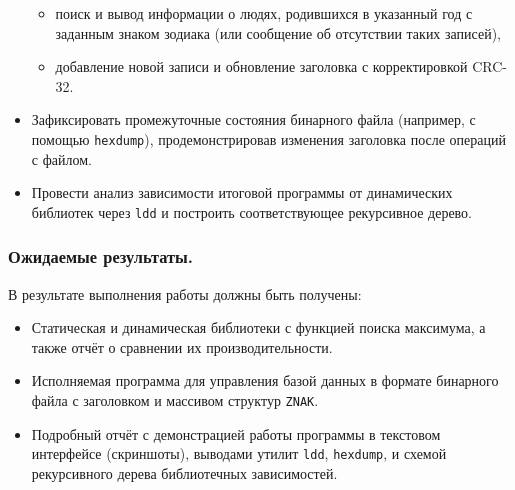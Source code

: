 \begin{itemize}
\begin{itemize}
\item поиск и вывод информации о людях, родившихся в указанный год с заданным знаком зодиака (или сообщение об отсутствии таких записей),
\item добавление новой записи и обновление заголовка с корректировкой CRC-32.
\end{itemize}
\item Зафиксировать промежуточные состояния бинарного файла (например, с помощью \texttt{hexdump}), продемонстрировав изменения заголовка после операций с файлом.
\item Провести анализ зависимости итоговой программы от динамических библиотек через \texttt{ldd} и построить соответствующее рекурсивное дерево.
\end{itemize}

\subsubsection*{Ожидаемые результаты.}
В результате выполнения работы должны быть получены:
\begin{itemize}
\item Статическая и динамическая библиотеки с функцией поиска максимума, а также отчёт о сравнении их производительности.
\item Исполняемая программа для управления базой данных в формате бинарного файла с заголовком и массивом структур \texttt{ZNAK}.
\item Подробный отчёт с демонстрацией работы программы в текстовом интерфейсе (скриншоты), выводами утилит \texttt{ldd}, \texttt{hexdump}, и схемой рекурсивного дерева библиотечных зависимостей.
\end{itemize}